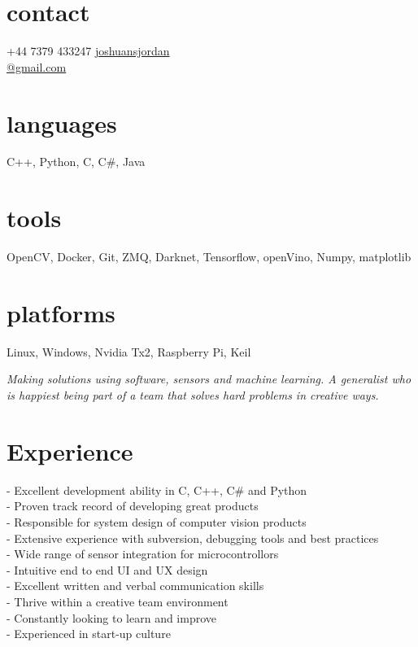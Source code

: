 \documentclass[print]{friggeri-cv} %
\begin{document}

\begin{aside} %
\section{contact}
+44 7379 433247
\href{mailto:joshuansjordan@gmail.com}{joshuansjordan\\@gmail.com}
\section{languages}
C++, Python, C, C\#, Java
\section{tools}
OpenCV, Docker, Git, ZMQ, Darknet, Tensorflow, openVino, Numpy, matplotlib
\section{platforms}
Linux, Windows, Nvidia Tx2, Raspberry Pi, Keil
\end{aside}

\emph{Making solutions using software, sensors and machine learning. A generalist who is happiest being part of a team that solves hard problems in creative ways.}

\section{Experience}
- Excellent development ability in C, C++, C\# and Python\\
- Proven track record of developing great products\\
- Responsible for system design of computer vision products\\
- Extensive experience with subversion, debugging tools and best practices\\
- Wide range of sensor integration for microcontrollors\\
- Intuitive end to end UI and UX design\\
- Excellent written and verbal communication skills\\
- Thrive within a creative team environment\\
- Constantly looking to learn and improve\\
- Experienced in start-up culture\\
\end{document}

